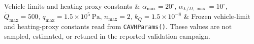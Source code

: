 ﻿Vehicle limits and heating-proxy constants & \(\alpha_{\max}=20^\circ\), \(\alpha_{L/D,\max}=10^\circ\), \(\dot Q_{\max}=500\), \(q_{\max}=1.5\times10^{5}~\mathrm{Pa}\), \(n_{\max}=2\), \(k_Q=1.5\times10^{-8}\) & Frozen vehicle-limit and heating-proxy constants read from \texttt{CAVHParams()}. These values are not sampled, estimated, or retuned in the reported validation campaign. \\
